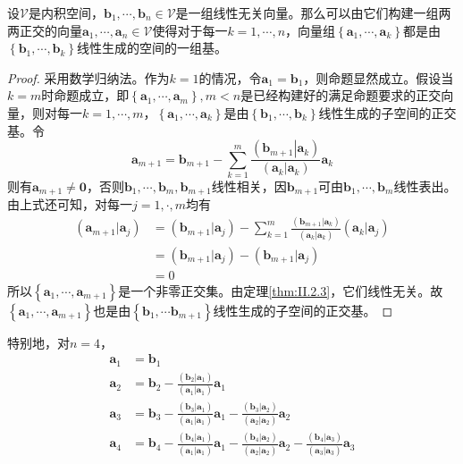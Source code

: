 \documentclass[main.tex]{subfiles}
\begin{document}
\begin{theorem}
设$\mathcal{V}$是内积空间，$\mathbf{b}_1,\cdots,\mathbf{b}_n\in\mathcal{V}$是一组线性无关向量。那么可以由它们构建一组两两正交的向量$\mathbf{a}_1,\cdots,\mathbf{a}_n\in\mathcal{V}$使得对于每一$k=1,\cdots,n$，向量组$\left\{\mathbf{a}_1,\cdots,\mathbf{a}_k\right\}$都是由$\left\{\mathbf{b}_1,\cdots,\mathbf{b}_k\right\}$线性生成的空间的一组基。
\end{theorem}
\begin{proof}
采用数学归纳法。作为$k=1$的情况，令$\mathbf{a}_1=\mathbf{b}_1$，则命题显然成立。假设当$k=m$时命题成立，即$\left\{\mathbf{a}_1,\cdots,\mathbf{a}_m\right\},m<n$是已经构建好的满足命题要求的正交向量，则对每一$k=1,\cdots,m$，$\left\{\mathbf{a}_1,\cdots,\mathbf{a}_k\right\}$是由$\left\{\mathbf{b}_1,\cdots,\mathbf{b}_k\right\}$线性生成的子空间的正交基。令
\[
\mathbf{a}_{m+1}=\mathbf{b}_{m+1}-\sum_{k=1}^m\frac{\left(\left.\mathbf{b}_{m+1}\right|\left.\mathbf{a}_k\right.\right)}{\left(\mathbf{a}_k|\mathbf{a}_k\right)}\mathbf{a}_k
\]
则有$\mathbf{a}_{m+1}\neq\mathbf{0}$，否则$\mathbf{b}_1,\cdots,\mathbf{b}_m,\mathbf{b}_{m+1}$线性相关，因$\mathbf{b}_{m+1}$可由$\mathbf{b}_1,\cdots,\mathbf{b}_m$线性表出。由上式还可知，对每一$j=1,\cdot,m$均有
\begin{align*}
\left(\mathbf{a}_{m+1}|\mathbf{a}_j\right)&=\left(\mathbf{b}_{m+1}|\mathbf{a}_j\right)-\sum_{k=1}^m\frac{\left(\mathbf{b}_{m+1}|\mathbf{a}_k\right)}{\left(\mathbf{a}_k|\mathbf{a}_k\right)}\left(\mathbf{a}_k|\mathbf{a}_j\right)\\
&=\left(\mathbf{b}_{m+1}|\mathbf{a}_j\right)-\left(\mathbf{b}_{m+1}|\mathbf{a}_j\right)\\
&=0
\end{align*}
所以$\left\{\mathbf{a}_1,\cdots,\mathbf{a}_{m+1}\right\}$是一个非零正交集。由定理\ref{thm:II.2.3}，它们线性无关。故$\left\{\mathbf{a}_1,\cdots,\mathbf{a}_{m+1}\right\}$也是由$\left\{\mathbf{b}_1,\cdots\mathbf{b}_{m+1}\right\}$线性生成的子空间的正交基。
\end{proof}

特别地，对$n=4$，
\begin{align*}
    \mathbf{a}_1&=\mathbf{b}_1\\
    \mathbf{a}_2&=\mathbf{b}_2-\frac{\left(\mathbf{b}_2|\mathbf{a}_1\right)}{\left(\mathbf{a}_1|\mathbf{a}_1\right)}\mathbf{a}_1\\
    \mathbf{a}_3&=\mathbf{b}_3-\frac{\left(\mathbf{b}_3|\mathbf{a}_1\right)}{\left(\mathbf{a}_1|\mathbf{a}_1\right)}\mathbf{a}_1-\frac{\left(\mathbf{b}_3|\mathbf{a}_2\right)}{\left(\mathbf{a}_2|\mathbf{a}_2\right)}\mathbf{a}_2\\
    \mathbf{a}_4&=\mathbf{b}_4-\frac{\left(\mathbf{b}_4|\mathbf{a}_1\right)}{\left(\mathbf{a}_1|\mathbf{a}_1\right)}\mathbf{a}_1-\frac{\left(\mathbf{b}_4|\mathbf{a}_2\right)}{\left(\mathbf{a}_2|\mathbf{a}_2\right)}\mathbf{a}_2-\frac{\left(\mathbf{b}_4|\mathbf{a}_3\right)}{\left(\mathbf{a}_3|\mathbf{a}_3\right)}\mathbf{a}_3
\end{align*}
\end{document}
